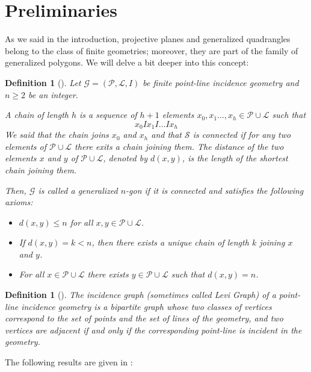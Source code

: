 \documentclass[12pt]{article}
\newtheorem{defn}[theorem]{Definition}
\begin{document}
\section{Preliminaries}
\label{sec:preliminaries}

As we said in the introduction, projective planes and generalized quadrangles belong to the class of finite geometries; moreover, they are part of the family of generalized polygons. We will delve a bit deeper into this concept:
 
\begin{defn}[\cite{KS20}]\label{kiss}
Let ${\mathcal{G}}=({\mathcal{P}},{\mathcal{L}},I)$ be finite point-line incidence geometry and $n\geq 2$ be an integer.

A chain of length $h$ is a sequence of $h+1$ elements $x_0,x_1\ldots,x_h\in {\mathcal{P}}\cup {\mathcal{L}}$ such that
$$x_0 I x_1 I \ldots Ix_h$$
We said that the chain joins $x_0$ and $x_h$ and that ${\mathcal{S}}$ is connected if for any two elements of ${\mathcal{P}}\cup {\mathcal{L}}$ there exits a chain joining them. The distance of the two elements $x$ and $y$ of ${\mathcal{P}}\cup {\mathcal{L}}$, denoted by $d(x,y)$, is the length of the shortest chain joining them. 

Then, ${\mathcal{G}}$ is called a {\emph{generalized $n$-gon}} if it is connected and satisfies the following axioms: 

\begin{itemize}
\item $d(x,y)\leq n$ for all $x,y\in {\mathcal{P}}\cup {\mathcal{L}}$.
\item If $d(x,y)=k<n$, then there exists a unique chain of length $k$ joining $x$ and $y$. 
\item For all $x\in {\mathcal{P}}\cup {\mathcal{L}}$ there exists $y\in {\mathcal{P}}\cup {\mathcal{L}}$ such that $d(x,y)=n$. 
\end{itemize}

\end{defn}

\begin{defn}[\cite{KS20}]\label{incidencegraphdef}
The incidence graph (sometimes called {\emph{Levi Graph}}) of a point-line incidence geometry is a bipartite graph whose two classes of vertices correspond to the set of points and the set of lines of the geometry, and two vertices are adjacent if and only if the corresponding point-line is incident in the geometry. 
\end{defn}

The following results are given in \cite{VM98}: 
\end{document}
